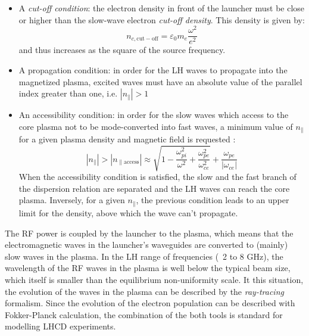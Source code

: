 \begin{itemize}
	\item  A \emph{cut-off condition}: the electron density in front of the launcher must be close or higher than the slow-wave electron \emph{cut-off density}. This density is given by:
	$$
	n_{c,\mathrm{cut-off}} = \varepsilon_0 m_e \frac{\omega^2}{e^2}
	$$
	and thus increases as the square of the source frequency. 
	\item A propagation condition: in order for the LH waves to propagate into the magnetized plasma, excited waves must have an absolute value of the parallel index greater than one, i.e. $|n_{\parallel}|>1$ 
	\item An accessibility condition: in order for the slow waves which access to the core plasma not to be mode-converted into fast waves, a minimum value of $n_{\parallel}$ for a given plasma density and magnetic field is requested :
	$$
	|n_{\parallel} |>| n_{\parallel \mathrm{access}} | 
	\approx 
	\sqrt{1 
		- \frac{\omega_{pi}^2}{\omega^2} 
		+ \frac{\omega_{pe}^2}{\omega_{ce}^2}}
	+ \frac{\omega_{pe} }{| \omega_{ce} |}
	$$ 
	When the accessibility condition is satisfied, the slow and the fast branch of the dispersion relation are separated and the LH waves can reach the core plasma.
	Inversely, for a given $n_{\parallel}$, the previous condition leads to an upper limit for the density, above which the wave can’t propagate.
\end{itemize}




The RF power is coupled by the launcher to the plasma, which means that the electromagnetic waves in the launcher’s waveguides are converted to (mainly) slow waves in the plasma. In the LH range of frequencies (~2 to 8 GHz), the wavelength of the RF waves in the plasma is well below the typical beam size, which itself is smaller than the equilibrium non-uniformity scale. It this situation, the evolution of the waves in the plasma can be described by the \emph{ray-tracing} formalism. Since the evolution of the electron population can be described with Fokker-Planck calculation, the combination of the both tools is standard for modelling LHCD experiments.

